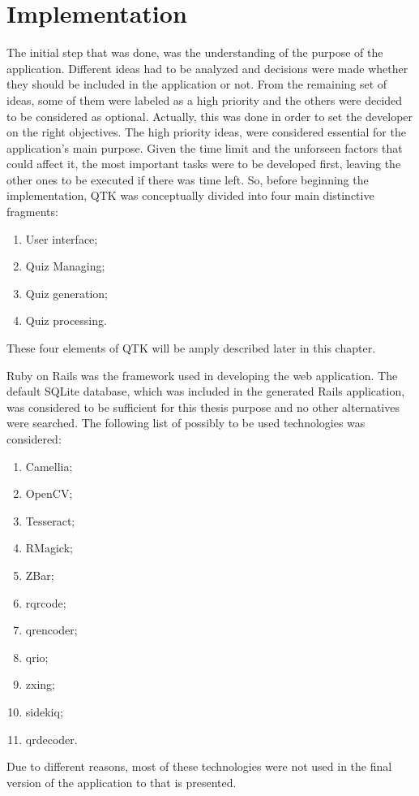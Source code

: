 \section{Implementation}
The initial step that was done, was the understanding of the purpose of the application. Different ideas had to be analyzed and decisions were made whether they should be included in the application or not. From the remaining set of ideas, some of them were labeled as a high priority and the others were decided to be considered as optional. Actually, this was done in order to set the developer on the right objectives. The high priority ideas, were considered essential for the application's main purpose. Given the time limit and the unforseen factors that could affect it, the most important tasks were to be developed first, leaving the other ones to be executed if there was time left. So, before beginning the implementation, QTK was conceptually divided into four main distinctive fragments:
\begin{enumerate}
  \item {User interface};
  \item {Quiz Managing};
  \item {Quiz generation};
  \item {Quiz processing}.
\end{enumerate}

These four elements of QTK will be amply described later in this chapter.

Ruby on Rails was the framework used in developing the web application. The default SQLite \cite{sqlite_doc} database, which was included in the generated Rails application, was considered to be sufficient for this thesis purpose and no other alternatives were searched. The following list of possibly to be used technologies was considered:
\begin{enumerate}
  \item Camellia;
  \item OpenCV;
  \item Tesseract;
  \item RMagick;
  \item ZBar;
  \item rqrcode;
  \item qrencoder;
  \item qrio;
  \item zxing;
  \item sidekiq;
  \item qrdecoder.
\end{enumerate}
Due to different reasons, most of these technologies were not used in the final version of the application to that is presented.

